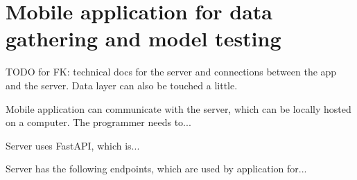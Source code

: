 
\section{Mobile application for data gathering and model testing}

TODO for FK: technical docs for the server and connections between the app and the server. Data layer can also be touched a little.

Mobile application can communicate with the server, which can be locally hosted on a computer. The programmer needs to...

Server uses FastAPI, which is...

Server has the following endpoints, which are used by application for...
